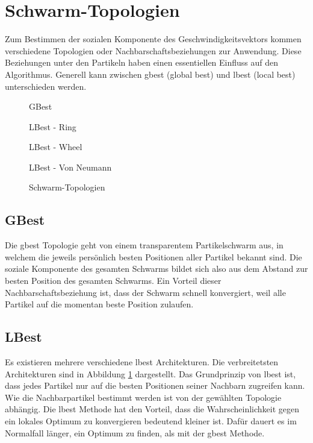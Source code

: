 \section{Schwarm-Topologien}
Zum Bestimmen der sozialen Komponente des Geschwindigkeitsvektors kommen verschiedene Topologien oder Nachbarschaftsbeziehungen zur Anwendung. Diese Beziehungen unter den Partikeln haben einen essentiellen Einfluss auf den Algorithmus. Generell kann zwischen gbest (global best) und lbest (local best) unterschieden werden.

\begin{figure}[htbp]
	\centering
	\begin{minipage}{4cm}
		\centering
		
		GBest
	\end{minipage}
	\begin{minipage}{4cm}
		\centering
		
		LBest - Ring
	\end{minipage}
	\begin{minipage}{4cm}
		\centering
		
		LBest - Wheel
	\end{minipage}
	\begin{minipage}{4cm}
		\centering
		
		LBest - Von Neumann
	\end{minipage}
	\caption{Schwarm-Topologien}
	\label{schwarm-topologien}
\end{figure}

\subsection{GBest}
Die gbest Topologie geht von einem transparentem Partikelschwarm aus, in welchem die jeweils persönlich besten Positionen aller Partikel bekannt sind. Die soziale Komponente des gesamten Schwarms bildet sich also aus dem Abstand zur besten Position des gesamten Schwarms. Ein Vorteil dieser Nachbarschaftsbeziehung ist, dass der Schwarm schnell konvergiert, weil alle Partikel auf die momentan beste Position zulaufen.

\subsection{LBest}
Es existieren mehrere verschiedene lbest Architekturen. Die verbreitetsten Architekturen sind in Abbildung \ref{schwarm-topologien} dargestellt. Das Grundprinzip von lbest ist, dass jedes Partikel nur auf die besten Positionen seiner Nachbarn zugreifen kann. Wie die Nachbarpartikel bestimmt werden ist von der gewählten Topologie abhängig. Die lbest Methode hat den Vorteil, dass die Wahrscheinlichkeit gegen ein lokales Optimum zu konvergieren bedeutend kleiner ist. Dafür dauert es im Normalfall länger, ein Optimum zu finden, als mit der gbest Methode.


